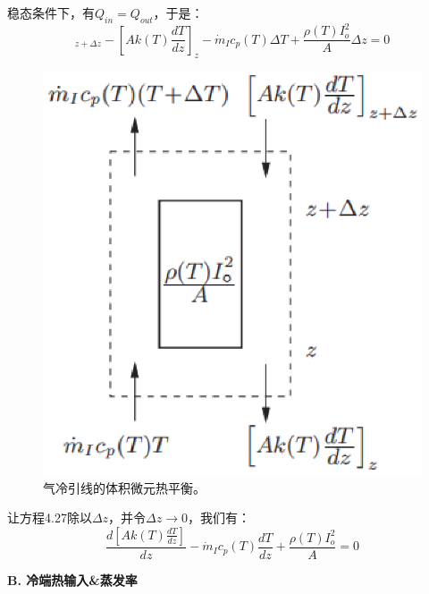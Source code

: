 稳态条件下，有$Q_{in}=Q_{out}$，于是：
\begin{equation}%
[Ak(T)\frac{dT}{dz}]_{z+\Delta z}-[Ak(T)\frac{dT}{dz}]_z-\dot{m}_Ic_p(T)\Delta T+\frac{\rho(T)I_{o}^{2}}{A}\Delta z=0
\end{equation}

\begin{figure}[htbp]
	\centering
	\includegraphics[scale=0.6]{chpt4/figs/fig4.20.eps}
	\caption{气冷引线的体积微元热平衡。}
\end{figure}

让方程4.27除以$\Delta z$，并令$\Delta z\rightarrow 0$，我们有：
\begin{equation}%
\frac{d[Ak(T)\frac{dT}{dz}]}{dz}-\dot{m}_Ic_p(T)\frac{dT}{dz}+\frac{\rho(T)I_{o}^{2}}{A}=0
\end{equation}

\textbf{B. 冷端热输入\&蒸发率}

